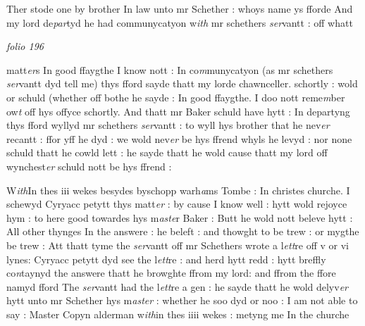 \documentclass[12pt, a4paper]{book}
\begin{document}
				\marginpar[\vspace{0.5cm}{\textcolor{Gray}{forde}}]{}
			
	
		\ifthenelse{\isodd{\thepage}}
		{\reversemarginpar}
		{\normalmarginpar}
		Ther stode one by brother In law unto mr Schether : whoys name ys fforde And my lord de\textit{par}tyd he had communycatyon w\textit{ith} mr schethers \textit{ser}vantt : off whatt
      				
\dotfill
						\newpage
{}

\textit{folio 196}
      				
      				
      				
      					
		\ifthenelse{\isodd{\thepage}}
		{\reversemarginpar}
		{\normalmarginpar}
		matt\textit{er}s In good ffaygthe I know nott : In co\textit{m}munycatyon (as mr schethers \textit{ser}vantt dyd tell me) thys fford sayde thatt my lorde chawnceller. schortly : wold or schuld
			 (whether off bothe he sayde : In good ffaygthe. I doo nott reme\textit{m}ber ow\textit{t} off hys offyce schortly. And thatt mr Baker schuld have hytt :
			 In departyng thys fford wyllyd mr schethers \textit{ser}vantt : to wyll hys brother that he nev\textit{er} recantt : ffor yff he dyd : we wold nev\textit{er} be hys ffrend whyls he levyd : nor none schuld thatt he cowld lett : he sayde thatt he wold cause thatt my lord off wynchest\textit{er} schuld nott be hys ffrend :
			 
      				

      				
      					
				\marginpar[\vspace{0.5cm}{\textcolor{Gray}{Cyriac Petitt}}]{}
			
      					
		\ifthenelse{\isodd{\thepage}}
		{\reversemarginpar}
		{\normalmarginpar}
		W\textit{ith}In thes iii wekes besydes byschopp warh\textit{a}ms Tombe : In christes churche. I schewyd Cyryacc petytt thys matt\textit{er} : by cause I know well : hytt wold rejoyce hym : to here good towardes hys m\textit{aste}r Baker : Butt he wold nott beleve hytt : All other thynges In the answere : he beleft : and thowght to be trew : or mygthe be trew : Att thatt tyme the \textit{ser}vantt off mr Schethers wrote a l\textit{ett}re off v or vi lynes: Cyryacc petytt dyd see the l\textit{ett}re : and herd hytt redd : hytt breffly co\textit{n}taynyd the answere thatt he browghte ffrom my lord: and ffrom the ffore namyd fford The \textit{ser}vantt had the l\textit{ett}re a gen : he sayde thatt he wold delyv\textit{er} hytt unto mr Schether hys m\textit{aster} : whether he soo dyd or noo : I am not able to say : Master Copyn alderman w\textit{ith}in thes iiii wekes : metyng me In the churche 
      				
\end{document}
